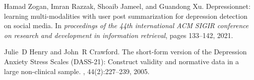 \begin{thebibliography}{10}
Hamad Zogan, Imran Razzak, Shoaib Jameel, and Guandong Xu.
\newblock Depressionnet: learning multi-modalities with user post summarization
  for depression detection on social media.
\newblock In {\em proceedings of the 44th international ACM SIGIR conference on
  research and development in information retrieval}, pages 133--142, 2021.

Julie~D Henry and John~R Crawford.
\newblock The short-form version of the Depression Anxiety Stress Scales (DASS-21): Construct validity and normative data in a large non-clinical sample.
, 44(2):227--239, 2005.



\end{thebibliography}
